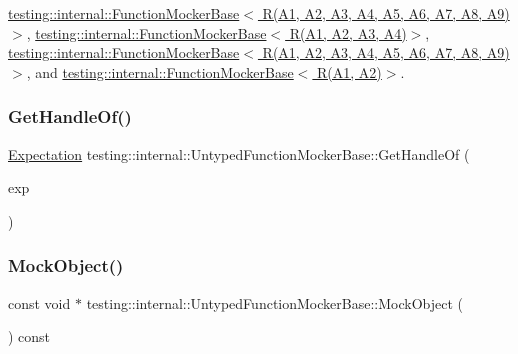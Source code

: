 \hyperlink{classtesting_1_1internal_1_1_function_mocker_base_ada818fcb2b892f21bb939def386599e7}{testing\+::internal\+::\+Function\+Mocker\+Base$<$ R(\+A1, A2, A3, A4, A5, A6, A7, A8, A9)$>$}, \hyperlink{classtesting_1_1internal_1_1_function_mocker_base_ada818fcb2b892f21bb939def386599e7}{testing\+::internal\+::\+Function\+Mocker\+Base$<$ R(\+A1, A2, A3, A4)$>$}, \hyperlink{classtesting_1_1internal_1_1_function_mocker_base_ada818fcb2b892f21bb939def386599e7}{testing\+::internal\+::\+Function\+Mocker\+Base$<$ R(\+A1, A2, A3, A4, A5, A6, A7, A8, A9) $>$}, and \hyperlink{classtesting_1_1internal_1_1_function_mocker_base_ada818fcb2b892f21bb939def386599e7}{testing\+::internal\+::\+Function\+Mocker\+Base$<$ R(\+A1, A2)$>$}.

\mbox{\label{classtesting_1_1internal_1_1_untyped_function_mocker_base_a7705611c4a63df16cddb0674878c403a}} 
\subsubsection{\texorpdfstring{Get\+Handle\+Of()}{GetHandleOf()}}
{\footnotesize\ttfamily \hyperlink{classtesting_1_1_expectation}{Expectation} testing\+::internal\+::\+Untyped\+Function\+Mocker\+Base\+::\+Get\+Handle\+Of (\begin{DoxyParamCaption}\item[{\hyperlink{classtesting_1_1internal_1_1_expectation_base}{Expectation\+Base} $\ast$}]{exp }\end{DoxyParamCaption})\hspace{0.3cm}{\ttfamily [protected]}}

\mbox{\label{classtesting_1_1internal_1_1_untyped_function_mocker_base_a71863dd67193a7082078d5b366d5ce51}} 
\subsubsection{\texorpdfstring{Mock\+Object()}{MockObject()}}
{\footnotesize\ttfamily const void $\ast$ testing\+::internal\+::\+Untyped\+Function\+Mocker\+Base\+::\+Mock\+Object (\begin{DoxyParamCaption}{ }\end{DoxyParamCaption}) const}

